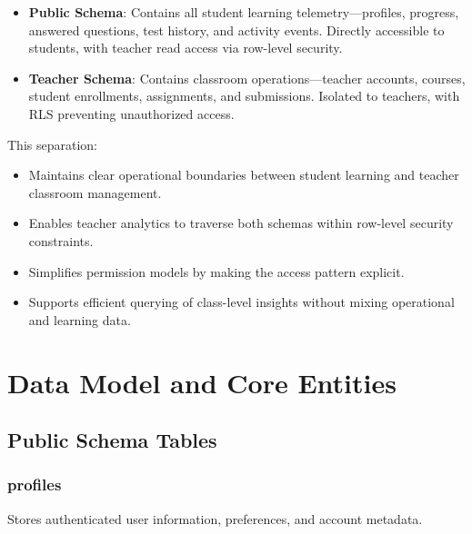 \documentclass[sigconf,authordraft,twoside]{acmart}
\begin{document}
\begin{itemize}
\item \textbf{Public Schema}: Contains all student learning telemetry---profiles, progress, answered questions, test history, and activity events. Directly accessible to students, with teacher read access via row-level security.

\item \textbf{Teacher Schema}: Contains classroom operations---teacher accounts, courses, student enrollments, assignments, and submissions. Isolated to teachers, with RLS preventing unauthorized access.
\end{itemize}

This separation:
\begin{itemize}
\item Maintains clear operational boundaries between student learning and teacher classroom management.
\item Enables teacher analytics to traverse both schemas within row-level security constraints.
\item Simplifies permission models by making the access pattern explicit.
\item Supports efficient querying of class-level insights without mixing operational and learning data.
\end{itemize}

\section{Data Model and Core Entities}

\subsection{Public Schema Tables}

\subsubsection{profiles}
Stores authenticated user information, preferences, and account metadata.
\end{document}
